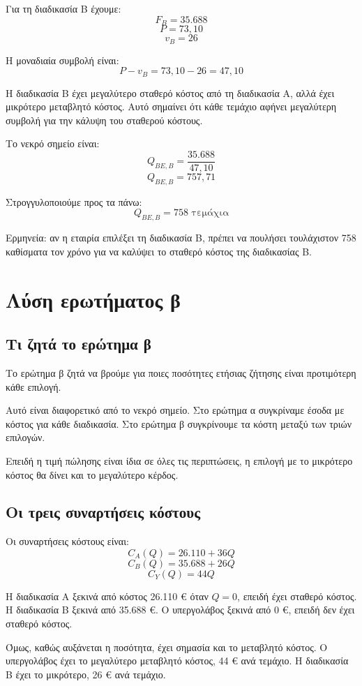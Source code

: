 \documentclass[12pt,a4paper]{article}
\begin{document}
Για τη διαδικασία Β έχουμε:
\[
F_B=35.688
\]
\[
P=73{,}10
\]
\[
v_B=26
\]

Η μοναδιαία συμβολή είναι:
\[
P-v_B=73{,}10-26=47{,}10
\]

Η διαδικασία Β έχει μεγαλύτερο σταθερό κόστος από τη διαδικασία Α, αλλά έχει μικρότερο μεταβλητό κόστος. Αυτό σημαίνει ότι κάθε τεμάχιο αφήνει μεγαλύτερη συμβολή για την κάλυψη του σταθερού κόστους.

Το νεκρό σημείο είναι:
\[
Q_{BE,B}=\frac{35.688}{47{,}10}
\]
\[
Q_{BE,B}=757{,}71
\]

Στρογγυλοποιούμε προς τα πάνω:
\[
\boxed{Q_{BE,B}=758 \text{ τεμάχια}}
\]

Ερμηνεία: αν η εταιρία επιλέξει τη διαδικασία Β, πρέπει να πουλήσει τουλάχιστον 758 καθίσματα τον χρόνο για να καλύψει το σταθερό κόστος της διαδικασίας Β.

\section{Λύση ερωτήματος β}

\subsection{Τι ζητά το ερώτημα β}

Το ερώτημα β ζητά να βρούμε για ποιες ποσότητες ετήσιας ζήτησης είναι προτιμότερη κάθε επιλογή.

Αυτό είναι διαφορετικό από το νεκρό σημείο. Στο ερώτημα α συγκρίναμε έσοδα με κόστος για κάθε διαδικασία. Στο ερώτημα β συγκρίνουμε τα κόστη μεταξύ των τριών επιλογών.

Επειδή η τιμή πώλησης είναι ίδια σε όλες τις περιπτώσεις, η επιλογή με το μικρότερο κόστος θα δίνει και το μεγαλύτερο κέρδος.

\subsection{Οι τρεις συναρτήσεις κόστους}

Οι συναρτήσεις κόστους είναι:
\[
C_A(Q)=26.110+36Q
\]
\[
C_B(Q)=35.688+26Q
\]
\[
C_Y(Q)=44Q
\]

Η διαδικασία Α ξεκινά από κόστος 26.110 € όταν \(Q=0\), επειδή έχει σταθερό κόστος. Η διαδικασία Β ξεκινά από 35.688 €. Ο υπεργολάβος ξεκινά από 0 €, επειδή δεν έχει σταθερό κόστος.

Όμως, καθώς αυξάνεται η ποσότητα, έχει σημασία και το μεταβλητό κόστος. Ο υπεργολάβος έχει το μεγαλύτερο μεταβλητό κόστος, 44 € ανά τεμάχιο. Η διαδικασία Β έχει το μικρότερο, 26 € ανά τεμάχιο.
\end{document}
